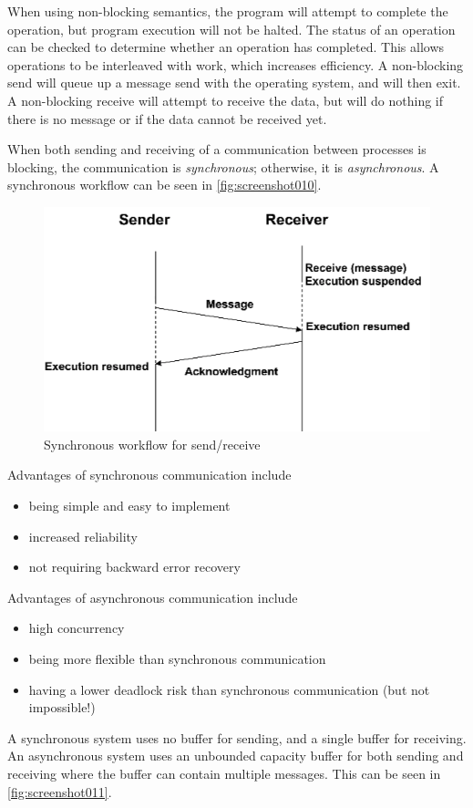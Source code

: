 When using non-blocking semantics, the program will attempt to complete the operation, but program execution will not be halted. The status of an operation can be checked to determine whether an operation has completed. This allows operations to be interleaved with work, which increases efficiency. A non-blocking send will queue up a message send with the operating system, and will then exit. A non-blocking receive will attempt to receive the data, but will do nothing if there is no message or if the data cannot be received yet.

When both sending and receiving of a communication between processes is blocking, the communication is \textit{synchronous}; otherwise, it is \textit{asynchronous}. A synchronous workflow can be seen in \autoref{fig:screenshot010}.

\begin{figure}[h]
\centering
\includegraphics[width=0.4\linewidth]{screenshot010}
\caption{Synchronous workflow for send/receive}
\label{fig:screenshot010}
\end{figure}

Advantages of synchronous communication include \begin{itemize}
\item being simple and easy to implement
\item increased reliability
\item not requiring backward error recovery
\end{itemize}

Advantages of asynchronous communication include \begin{itemize}
\item high concurrency
\item being more flexible than synchronous communication
\item having a lower deadlock risk than synchronous communication (but not impossible!)
\end{itemize}

A synchronous system uses no buffer for sending, and a single buffer for receiving. An asynchronous system uses an unbounded capacity buffer for both sending and receiving where the buffer can contain multiple messages. This can be seen in \autoref{fig:screenshot011}.

